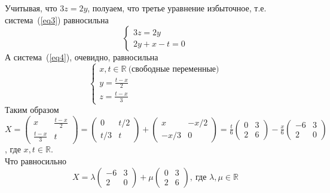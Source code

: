 \documentclass{article}
\begin{document}
Учитывая, что  $3z=2y$, полуаем, что третье уравнение избыточное, т.е. система~(\ref{eq3}) равносильна
\begin{equation}
\label{eq4}
    \begin{cases}3z=2y\\2y+x-t=0\end{cases}
\end{equation}
А система~(\ref{eq4}), очевидно, равносильна
$$\begin{cases}x,t\in \mathbb{R}\ \textrm{(свободные переменные)}\\y=\frac{t-x}{2}\\z=\frac{t-x}{3}\end{cases}$$
Таким образом $X=\left(\begin{array}{cc}x & \frac{t-x}{2}\\\frac{t-x}{3} & t\end{array}\right)=\left(\begin{array}{cc}0 & t/2\\t/3 & t\end{array}\right)+\left(\begin{array}{cc}x & -x/2\\-x/3 & 0\end{array}\right)=\frac{t}{6}\left(\begin{array}{rr}0 & 3\\2 & 6\end{array}\right) -\frac{x}{6}\left(\begin{array}{rr}-6 & 3\\2 & 0\end{array}\right)$, где $x,t\in\mathbb{R}$.
\\
Что равносильно
$$X=\lambda\left(\begin{array}{rr}-6 & 3\\2 & 0\end{array}\right)+\mu\left(\begin{array}{rr}0 & 3\\2 & 6\end{array}\right),\ \textrm{где }\lambda,\mu\in\mathbb{R}$$
\end{document}

